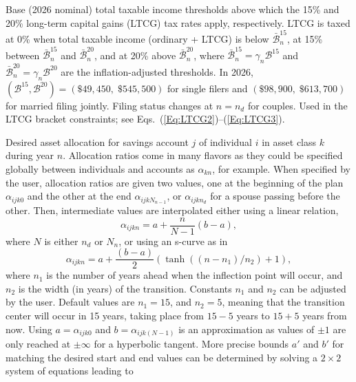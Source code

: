 \documentclass[fleqn,12pt]{report}
\begin{document}
\begin{description}[leftmargin=4em,style=multiline]
\item [$\mathcal{B}^{15}$, $\mathcal{B}^{20}$]
	Base (2026 nominal) total taxable income thresholds above which the 15\% and 20\%
	long-term capital gains (LTCG) tax rates apply, respectively.
	LTCG is taxed at 0\% when total taxable income (ordinary + LTCG) is below $\bar{\mathcal{B}}^{15}_n$,
	at 15\% between $\bar{\mathcal{B}}^{15}_n$ and $\bar{\mathcal{B}}^{20}_n$, and at 20\% above $\bar{\mathcal{B}}^{20}_n$,
	where $\bar{\mathcal{B}}^{15}_n = \gamma_n \mathcal{B}^{15}$ and $\bar{\mathcal{B}}^{20}_n = \gamma_n \mathcal{B}^{20}$
	are the inflation-adjusted thresholds.
	In 2026, $(\mathcal{B}^{15}, \mathcal{B}^{20}) = (\$49{,}450,\;\$545{,}500)$ for single filers and
	$(\$98{,}900,\;\$613{,}700)$ for married filing jointly.
	Filing status changes at $n = n_d$ for couples.
	Used in the LTCG bracket constraints; see Eqs.~(\ref{Eq:LTCG2})--(\ref{Eq:LTCG3}).
\item [$\alpha_{ijkn}$]
	Desired asset allocation for savings account $j$ of individual $i$ in
	asset class $k$ during year $n$.
	Allocation ratios come in many flavors as they could be specified globally between
	individuals and accounts as $\alpha_{kn}$, for example.
	When specified by the user, allocation ratios are given two values, one at the
	beginning of the plan $\alpha_{ijk0}$ and the other at the end
	$\alpha_{ijkN_{n-1}}$, or $\alpha_{ijkn_d}$ for a spouse passing before the other.
        Then, intermediate values are interpolated either using
	a linear relation,
\begin{equation}
	\alpha_{ijkn} = a + \frac{n}{N - 1} (b - a),
\end{equation}
where $N$ is either $n_d$ or $N_n$, or using an s-curve as in
\begin{equation}
	\alpha_{ijkn} = a + \frac{(b - a)}{2}
	(\tanh((n-n_1)/n_2) + 1),
\end{equation}
	where $n_1$ is the number of years ahead when the inflection point will occur, and $n_2$ is the
	width (in years) of the transition. Constants $n_1$ and $n_2$ can be adjusted by the user.
	Default values are $n_1 = 15$, and $n_2 = 5$, meaning that the transition center will occur
	in 15 years, taking place from $15-5$ years to $15+5$ years from now.
	Using $a = \alpha_{ijk0}$ and $b = \alpha_{ijk(N-1)}$ is an approximation as values of $\pm 1$
	are only reached at $\pm \infty$ for a hyperbolic tangent.
	More precise bounds $a'$ and $b'$ for matching the desired start and end values
	can be determined by solving a $2\times 2$ system of equations leading to
	\begin{eqnarray}

\end{eqnarray}
\end{description}
\end{document}
